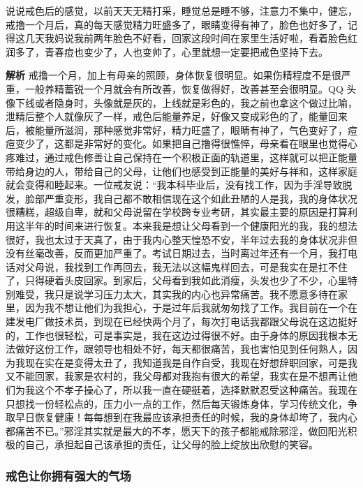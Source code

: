 \begin{case}
    说说戒色后的感觉，以前天天无精打采，睡觉总是睡不够，注意力不集中，健忘，戒撸一个月后，真的每天感觉精力旺盛多了，眼睛变得有神了，脸色也好多了，记得这几天我妈说我前两年脸色不好看，回家这段时间在家里生活好啦，看着脸色红润多了，青春痘也变少了，人也变帅了，心里就想一定要把戒色坚持下去。

    \textbf{解析} 戒撸一个月，加上有母亲的照顾，身体恢复很明显。如果伤精程度不是很严重，一般养精蓄锐一个月就会有所改善，恢复做得好，改善甚至会很明显。QQ 头像下线或者隐身时，头像就是灰的，上线就是彩色的，我之前也拿这个做过比喻，泄精后整个人就像灰了一样，戒色后能量养足，好像又变成彩色的了，能量回来后，被能量所滋润，那种感觉非常好，精力旺盛了，眼睛有神了，气色变好了，痘痘变少了，这都是非常好的变化。如果把自己撸得很憔悴，母亲看在眼里也觉得心疼难过，通过戒色修善让自己保持在一个积极正面的轨道里，这样就可以把正能量带给身边的人，带给自己的父母，让他们也感受到正能量的美好与祥和，这样家庭就会变得和睦起来。一位戒友说：“我本科毕业后，没有找工作，因为手淫导致脱发，脸部严重变形，我自己都不敢相信现在这个如此丑陋的人是我，我的身体状况很糟糕，超级自卑，就和父母说留在学校跨专业考研，其实最主要的原因是打算利用这半年的时间来进行恢复。本来我是想让父母看到一个健康阳光的我，我的想法很好，我也太过于天真了，由于我内心整天惶恐不安，半年过去我的身体状况非但没有丝毫改善，反而更加严重了。考试日期过去，当时离过年还有一个月，我打电话对父母说，我找到工作再回去，我无法以这幅鬼样回去，可是我实在是扛不住了，只得硬着头皮回家。到家后，父母看到我如此消瘦，头发也少了不少，心里特别难受，我只是说学习压力太大，其实我的内心也异常痛苦。我不愿意多待在家里，因为我不想让他们为我担心，于是过年后我就匆匆找了工作。我目前在一个在建发电厂做技术员，到现在已经快两个月了，每次打电话我都跟父母说在这边挺好的，工作也很轻松，可是事实是，我在这边过得很不好。由于身体的原因我根本无法做好这份工作，跟领导也相处不好，每天都很痛苦，我也害怕见到任何熟人，因为我现在实在是变得太丑了，我知道我是自作自受，我现在好想辞职回家，可是我又不能回家，我家是农村的，我父母都对我抱有很大的希望，我实在是不想再让他们为我这个不孝子操心了，所以我一直在硬挺着，选择默默忍受这种痛苦。我现在只想找一份轻松点的，压力小一点的工作，然后每天锻炼身体，学习传统文化，争取早日恢复健康！每每想到在我最应该承担责任的时候，我的身体却垮了，我内心都痛苦不已。”邪淫其实就是最大的不孝，愿天下的孩子都能戒除邪淫，做回阳光积极的自己，承担起自己该承担的责任，让父母的脸上绽放出欣慰的笑容。
\end{case}

\subsubsection{戒色让你拥有强大的气场}

